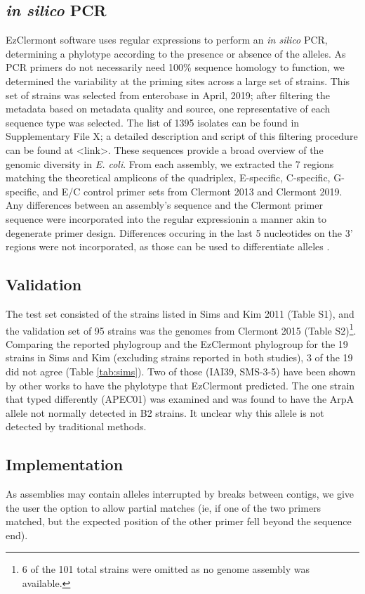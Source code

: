 \subsection*{\textit{in silico} PCR}
EzClermont software uses regular expressions to perform an \textit{in silico} PCR, determining a phylotype according to the presence or absence of the alleles. As PCR primers do not necessarily need 100\% sequence homology to function, we determined the variability at the priming sites across a large set of strains. This set of strains was selected from enterobase in April, 2019; after filtering the metadata based on metadata quality and source, one representative of each sequence type was selected.  The list of 1395 isolates can be found in Supplementary File X; a detailed description and script of this filtering  procedure can be found at <link>.  These sequences provide  a broad overview of the genomic diversity in \textit{E. coli}. From each assembly, we extracted the 7 regions matching the theoretical amplicons of the quadriplex, E-specific, C-specific, G-specific, and E/C control primer sets from Clermont 2013 and Clermont 2019.  Any differences between an assembly's sequence and the Clermont primer sequence were incorporated into the regular expressionin a manner akin to degenerate primer design. Differences occuring in the last 5 nucleotides on the 3’ regions were not incorporated, as those can be used to differentiate alleles \cite{Stadhouders2010}.


\subsection*{Validation}

The test set consisted of the strains listed in Sims and Kim 2011\cite{Sims2011} (Table S1), and the validation set of 95 strains was the genomes from Clermont 2015\cite{Denamur2015} (Table S2)\footnote{6 of the 101 total strains were omitted as no genome assembly was available.}.  Comparing the reported phylogroup and the EzClermont phylogroup for the 19 strains in Sims and Kim (excluding strains reported in both studies),  3 of the 19 did not agree (Table \ref{tab:sims}). Two of those (IAI39, SMS-3-5) have been shown by other works to have the phylotype that EzClermont predicted. The one strain that typed differently (APEC01) was examined and was found to have the ArpA allele not normally detected in B2 strains. It unclear why this allele is not detected by traditional methods.

\subsection*{Implementation}
 As assemblies may contain alleles interrupted by breaks between contigs, we give the user the option to allow partial matches (ie, if one of the two primers matched, but the expected position of the other primer fell beyond the sequence end).

